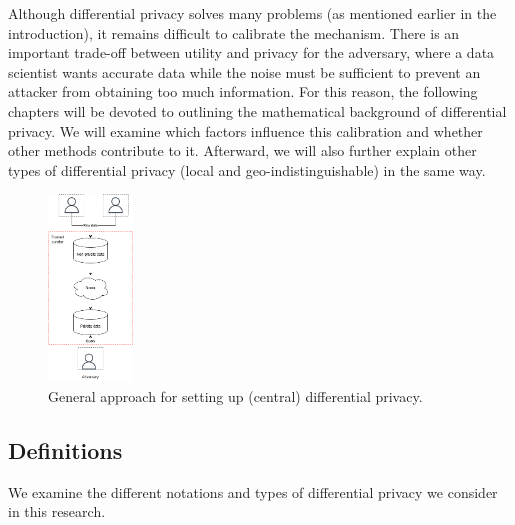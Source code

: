 Although differential privacy solves many problems (as mentioned earlier in the introduction), it remains difficult to calibrate the mechanism.
There is an important trade-off between utility and privacy for the adversary, where a data scientist wants accurate data while the noise must be sufficient to prevent an attacker from obtaining too much information.
For this reason, the following chapters will be devoted to outlining the mathematical background of differential privacy.
We will examine which factors influence this calibration and whether other methods contribute to it.
Afterward, we will also further explain other types of differential privacy (local and geo-indistinguishable) in the same way.
\begin{figure}[h!]
  \includegraphics[width=0.2\textwidth]{TheorethicalFramework/Differential privacy/central-dp.png}
  \caption{General approach for setting up (central) differential privacy.}
  \label{fig:central-dp}
\end{figure}

\newpage
\subsection{Definitions}
We examine the different notations and types of differential privacy we consider in this research.

